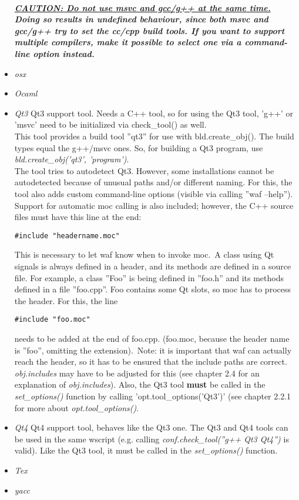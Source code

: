 \documentclass[a4,10pt]{article}
\begin{document}
\begin{itemize}
\\
		\emph{\textbf{\underline{CAUTION: Do not use msvc and gcc/g++ at the same time.} Doing so results in undefined behaviour, since both msvc and gcc/g++ try to set the cc/cpp build tools. If you want to support multiple compilers, make it possible to select one via a command-line option instead.}}
	\item \emph{osx}
	\item \emph{Ocaml}
	\item \emph{Qt3}
		Qt3 support tool. Needs a C++ tool, so for using the Qt3 tool, 'g++' or 'msvc' need to be initialized via check\_tool() as well.\\
		This tool provides a build tool ''qt3'' for use with bld.create\_obj(). The build types equal the g++/msvc ones. So, for building a Qt3 program, use \emph{bld.create\_obj('qt3', 'program')}.
		\\
		The tool tries to autodetect Qt3. However, some installations cannot be autodetected because of unusual paths and/or different naming. For this, the tool also adds custom command-line options (visible via calling ''waf --help''). Support for automatic moc calling is also included; however, the C++ source files must have this line at the end: \begin{verbatim}#include "headername.moc"\end{verbatim} This is necessary to let waf know when to invoke moc.\
		A class using Qt signals is always defined in a header, and its methods are defined in a source file. For example, a class ''Foo'' is being defined in ''foo.h'' and its methods defined in a file ''foo.cpp''. Foo contains some Qt slots, so moc has to process the header. For this, the line \begin{verbatim}#include "foo.moc"\end{verbatim} needs to be added at the end of foo.cpp. (foo.moc, because the header name is ''foo'', omitting the extension).\
		Note: it is important that waf can actually reach the header, so it has to be ensured that the include paths are correct. \emph{obj.includes} may have to be adjusted for this (see chapter 2.4 for an explanation of \emph{obj.includes}). Also, the Qt3 tool \textbf{must} be called in the \emph{set\_options()} function by calling 'opt.tool\_options('Qt3')' (see chapter 2.2.1 for more about \emph{opt.tool\_options()}.
	\item \emph{Qt4}
		Qt4 support tool, behaves like the Qt3 one. The Qt3 and Qt4 tools can be used in the same wscript (e.g. calling \emph{conf.check\_tool(''g++ Qt3 Qt4'')} is valid). Like the Qt3 tool, it must be called in the \emph{set\_options()} function.
	\item \emph{Tex}
	\item \emph{yacc}
\end{itemize}
\end{document}
